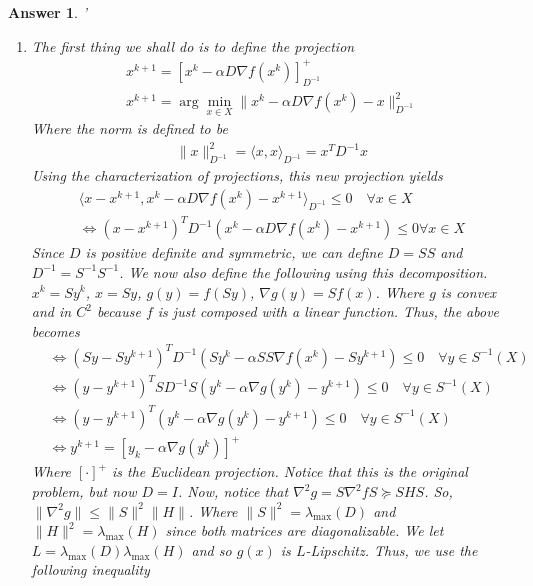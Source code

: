 \documentclass[12pt]{article}
\theoremstyle{colon}
\newtheorem*{answer}{Answer}
\begin{document}
\begin{answer}
  \leavevmode'
  \begin{enumerate}[label=\arabic*)]
    \item The first thing we shall do is to define the projection
      \begin{gather*}
        x^{k+1} = [x^k - \alpha D \nabla f(x^k)]_{D^{-1}}^+ \\
        x^{k+1} = \arg \min_{x \in X} \lVert x^k - \alpha D \nabla f(x^k) - x \rVert_{D^{-1}}^2
      \end{gather*}
      Where the norm is defined to be
      \begin{gather*}
        \lVert x \rVert_{D^{-1}}^2 = \langle x, x \rangle_{D^{-1}} = x^T D^{-1} x
      \end{gather*}
      Using the characterization of projections, this new projection yields
      \begin{gather*}
        \langle x - x^{k+1}, x^k - \alpha D \nabla f(x^k) - x^{k+1} \rangle_{D^{-1}} \leq 0 \quad \forall x \in X \\
        \Longleftrightarrow (x - x^{k+1})^T D^{-1} (x^k - \alpha D \nabla f(x^k) - x^{k+1}) \leq 0 \forall x \in X
      \end{gather*}
      Since $D$ is positive definite and symmetric, we can define $D = SS$ and $D^{-1} = S^{-1}S^{-1}$. We now also define the following using this decomposition. $x^k = S y^k$, $x = S y$, $g(y) = f(S y)$, $\nabla g(y) = S f(x)$. Where $g$ is convex and in $C^2$ because $f$ is just composed with a linear function. Thus, the above becomes
      \begin{align*}
        &\Longleftrightarrow (S y - S y^{k+1})^T D^{-1} (S y^k - \alpha SS \nabla f(x^k) - S y^{k+1}) \leq 0 \quad \forall y \in S^{-1}(X) \\
        &\Longleftrightarrow (y - y^{k+1})^T S D^{-1} S (y^k - \alpha \nabla g(y^k) - y^{k+1}) \leq 0 \quad \forall y \in S^{-1}(X) \\
        &\Longleftrightarrow (y - y^{k+1})^T (y^k - \alpha \nabla g(y^k) - y^{k+1}) \leq 0 \quad \forall y \in S^{-1}(X) \\
        &\Longleftrightarrow y^{k+1} = [y_k - \alpha \nabla g(y^k)]^+
      \end{align*}
      Where $[\cdot]^+$ is the Euclidean projection. Notice that this is the original problem, but now $D = I$. Now, notice that $\nabla^2 g = S \nabla^2 f S \succeq S H S$. So, $\lVert \nabla^2 g \rVert \leq \lVert S \rVert^2 \lVert H \rVert$. Where $\lVert S \rVert^2 = \lambda_{\text{max}}(D)$ and $\lVert H \rVert^2 = \lambda_{\text{max}}(H)$ since both matrices are diagonalizable. We let $L = \lambda_{\text{max}}(D)\lambda_{\text{max}}(H)$ and so $g(x)$ is $L$-Lipschitz. Thus, we use the following inequality

\end{enumerate}
\end{answer}
\end{document}
